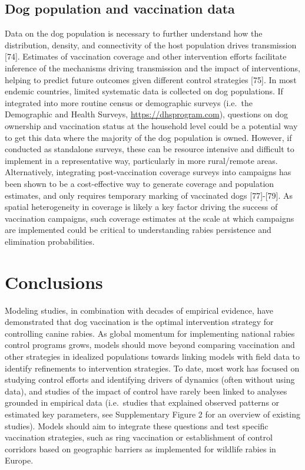 \documentclass[
]{book}
\begin{document}
\hypertarget{dog-population-and-vaccination-data}{%
\subsection{Dog population and vaccination data}\label{dog-population-and-vaccination-data}}

Data on the dog population is necessary to further understand how the
distribution, density, and connectivity of the host population drives
transmission {[}74{]}. Estimates of vaccination coverage and other
intervention efforts facilitate inference of the mechanisms driving
transmission and the impact of interventions, helping to predict future
outcomes given different control strategies {[}75{]}. In most endemic
countries, limited systematic data is collected on dog populations. If
integrated into more routine census or demographic surveys (i.e.~the
Demographic and Health Surveys, \url{https://dhsprogram.com}), questions on
dog ownership and vaccination status at the household level could be a
potential way to get this data where the majority of the dog population
is owned. However, if conducted as standalone surveys, these can be
resource intensive and difficult to implement in a representative way,
particularly in more rural/remote areas. Alternatively, integrating
post-vaccination coverage surveys into campaigns has been shown to be a
cost-effective way to generate coverage and population estimates, and
only requires temporary marking of vaccinated dogs {[}77{]}-{[}79{]}. As
spatial heterogeneity in coverage is likely a key factor driving the
success of vaccination campaigns, such coverage estimates at the scale
at which campaigns are implemented could be critical to understanding
rabies persistence and elimination probabilities.

\hypertarget{conclusions}{%
\section{Conclusions}\label{conclusions}}

Modeling studies, in combination with decades of empirical evidence,
have demonstrated that dog vaccination is the optimal intervention
strategy for controlling canine rabies. As global momentum for
implementing national rabies control programs grows, models should move
beyond comparing vaccination and other strategies in idealized
populations towards linking models with field data to identify
refinements to intervention strategies. To date, most work has focused
on studying control efforts and identifying drivers of dynamics (often
without using data), and studies of the impact of control have rarely
been linked to analyses grounded in empirical data (i.e.~studies that
explained observed patterns or estimated key parameters, see
Supplementary Figure 2 for an overview of existing studies). Models
should aim to integrate these questions and test specific vaccination
strategies, such as ring vaccination or establishment of control
corridors based on geographic barriers as implemented for wildlife
rabies in Europe.
\end{document}

